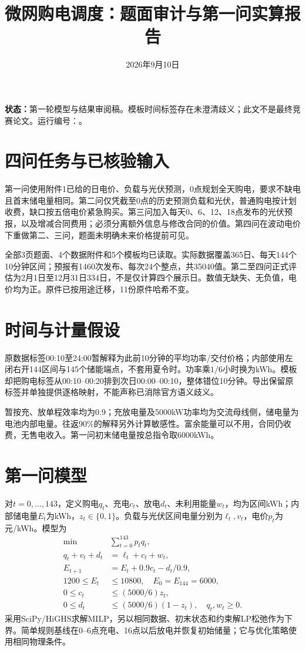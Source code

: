 \documentclass[UTF8,11pt,a4paper]{ctexart}
\title{微网购电调度：题面审计与第一问实算报告}
\author{}
\date{2026年9月10日}
\begin{document}
\pagestyle{plain}
\maketitle
\noindent\textbf{状态：}第一轮模型与结果审阅稿。模板时间标签存在未澄清歧义；此文不是最终竞赛论文。运行编号：\texttt{\RunID}。

\section{四问任务与已核验输入}
第一问使用附件1已给的日电价、负载与光伏预测，0点规划全天购电，要求不缺电且首末储电量相同。第二问仅凭截至0点的历史预测负载和光伏，普通购电按计划收费，缺口按五倍电价紧急购买。第三问加入每天0、6、12、18点发布的光伏预报，以及增减合同费用；必须分离额外信息与修改合同的价值。第四问在波动电价下重做第二、三问，题面未明确未来价格提前可见。

全部3页题面、4个数据附件和5个模板均已读取。实际数据覆盖365日、每天144个10分钟区间；预报有1460次发布、每次24个整点，共35040值。第二至四问正式评估为2月1日至12月31日334日，不是仅计算四个展示日。数值无缺失、无负值，电价均为正。原件已按用途迁移，11份原件哈希不变。

\section{时间与计量假设}
原数据标签00:10至24:00暂解释为此前10分钟的平均功率/交付价格；内部使用左闭右开144区间与145个储能端点，不套用夏令时。功率乘$1/6$小时换为kWh。模板却把购电标签从00:10--00:20排到次日00:00--00:10，整体错位10分钟。导出保留原标签并单独提供逐格映射，不能声称已消除官方语义歧义。

暂按充、放单程效率均为0.9；充放电量及5000kW功率均为交流母线侧，储电量为电池内部电量。往返90\%的解释另外计算敏感性。富余能量可以不用，合同仍收费，无售电收入。第一问初末储电量按总指令取6000kWh。

\section{第一问模型}
对$t=0,\ldots,143$，定义购电$q_t$、充电$c_t$、放电$d_t$、未利用能量$w_t$，均为区间kWh；内部储电量$E_t$为kWh，$z_t\in\{0,1\}$。负载与光伏区间电量分别为$\ell_t,v_t$，电价$p_t$为元/kWh。模型为
\begin{align}
\min\quad &\sum_{t=0}^{143}p_tq_t,\\
q_t+v_t+d_t&=\ell_t+c_t+w_t,\\
E_{t+1}&=E_t+0.9c_t-d_t/0.9,\\
1200\le E_t&\le10800,\quad E_0=E_{144}=6000,\\
0\le c_t&\le(5000/6)z_t,\\
0\le d_t&\le(5000/6)(1-z_t),\quad q_t,w_t\ge0.
\end{align}
采用SciPy/HiGHS求解MILP，另以相同数据、初末状态和约束解LP松弛作为下界。简单规则基线在0--6点充电、16点以后放电并恢复初始储量；它与优化策略使用相同物理条件。
\end{document}
